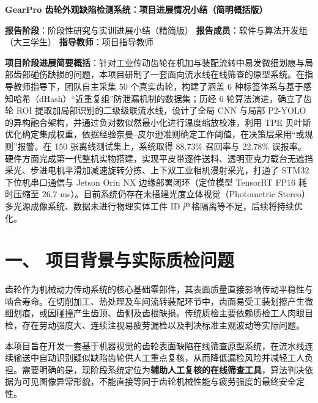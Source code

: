 
\begin{center}
{\bfseries GearPro 齿轮外观缺陷检测系统：项目进展情况小结（简明概括版）\par}
\end{center}

\vspace{0.6em}
\noindent\textbf{报告阶段}：阶段性研究与实训进展小结（精简版） \hfill
\textbf{报告成员}：软件与算法开发组（大三学生） \hfill
\textbf{指导教师}：项目指导教师 \par
\vspace{0.8em}

\textbf{项目阶段进展简要概括}：针对工业传动齿轮在机加与装配流转中易发微细划痕与局部齿部碰伤缺损的问题，本项目研制了一套面向流水线在线筛查的原型系统。在指导教师指导下，团队自主采集 50 个真实齿轮，构建了涵盖 6 种标签体系与基于感知哈希（dHash）“近重复组”防泄漏机制的数据集；历经 6 轮算法演进，确立了齿轮 ROI 提取加局部识别的二级级联流水线，设计了全局 CNN 与局部 P2-YOLO 的异构融合架构，并通过负对数似然最小化进行温度缩放校准，利用 TPE 贝叶斯优化确定集成权重，依据经验奈曼–皮尔逊准则确定工作阈值，在决策层采用“或规则”报警。在 150 张离线测试集上，系统取得 88.73\% 召回率与 22.78\% 误报率。硬件方面完成第一代整机实物搭建，实现平皮带逐件送料、透明亚克力载台无遮挡采光、步进电机平滑加减速旋转分拣、上下双工业相机漫射采光，打通了 STM32 下位机串口通信与 Jetson Orin NX 边缘部署闭环（定位模型 TensorRT FP16 耗时压缩至 26.7 ms）。目前系统仍存在未搭建光度立体视觉（Photometric Stereo）多光源成像系统、数据未进行物理实体工件 ID 严格隔离等不足，后续将持续优化。

\section*{一、 项目背景与实际质检问题}

齿轮作为机械动力传动系统的核心基础零部件，其表面质量直接影响传动平稳性与啮合寿命。在切削加工、热处理及车间流转装配环节中，齿面易受工装划擦产生微细划痕，或因碰撞产生齿顶、齿侧及齿根缺损。传统质检主要依赖质检工人肉眼目检，存在劳动强度大、连续注视易疲劳漏检以及判决标准主观波动等实际问题。

本项目旨在开发一套基于机器视觉的齿轮表面缺陷在线筛查原型系统，在流水线连续输送中自动识别疑似缺陷齿轮供人工重点复核，从而降低漏检风险并减轻工人负担。需要明确的是，现阶段系统定位为\textbf{辅助人工复核的在线筛查工具}，算法判决依据为可见图像异常形貌，不能直接等同于齿轮机械性能与疲劳强度的最终安全定性。

